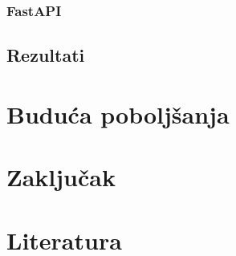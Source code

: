 \documentclass[a4paper,12pt]{article}
\begin{document}
	\subsubsection{FastAPI}
	\subsection{Rezultati}
	\newpage
	
	\section{Buduća poboljšanja}
	\newpage
	
	\section{Zaključak}
	\newpage
	
	\section*{Literatura}
	\newpage
\end{document}
